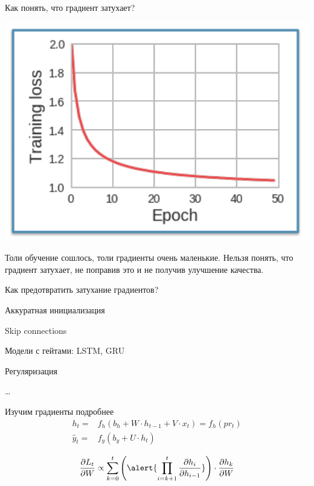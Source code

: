 \documentclass[notes,12pt, aspectratio=169]{beamer}
\newenvironment{wideitemize}{\itemize\addtolength{\itemsep}{10pt}}{\enditemize}
\begin{document}
\begin{frame}{Как понять, что градиент затухает?}
\begin{center}
	\includegraphics[width=.5\linewidth]{rnn9_1.png}
\end{center}
Толи обучение сошлось, толи градиенты очень маленькие. Нельзя понять, что градиент затухает, не поправив это и не получив улучшение качества. 
\end{frame}

\begin{frame}{Как предотвратить затухание градиентов?}
\begin{wideitemize} 
	\item Аккуратная инициализация 
	\item Skip connections
	\item Модели с гейтами: LSTM, GRU
	\item Регуляризация
	\item \ldots 
\end{wideitemize} 
\end{frame}


\begin{frame}{Изучим градиенты подробнее}
	\large
		\begin{equation*} 
			\begin{aligned}
				h_t =& f_h(b_h + W \cdot h_{t-1} + V \cdot x_t) = f_h(pr_t)\\
				\hat{y}_t =& f_y(b_y + U \cdot h_t)
			\end{aligned}
		\end{equation*} 
		
		\par \mbox{} \par
		
		\[\frac{\partial L_t}{\partial W}  \propto \sum_{k=0}^t \left( \alert{\prod_{i=k+1}^t  \frac{\partial h_i}{\partial h_{i-1}}} \right) \cdot  \frac{\partial h_k}{\partial W} \]
		
		\par \mbox{} \par
		

		\par \mbox{} \par
		
\end{frame}
\end{document}
